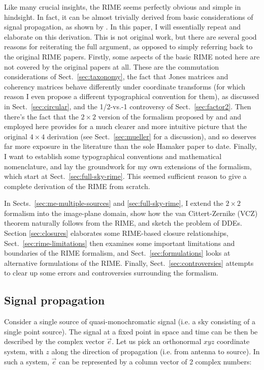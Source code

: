\documentclass{aa}
\begin{document}
Like many crucial insights, the RIME seems perfectly obvious and simple in hindsight. In fact, it can be almost trivially derived from basic considerations of signal propagation, as shown by \citet{ME1}. In this paper, I will essentially repeat and elaborate on this derivation. This is not original work, but there are several good reasons for reiterating the full argument, as opposed to simply referring back to the original RIME papers. Firstly, some aspects of the basic RIME noted here are not covered by the original papers at all. These are the commutation considerations of Sect.~\ref{sec:taxonomy}, the fact that Jones matrices and coherency matrices behave differently under coordinate transforms (for which reason I even propose a different typographical convention for them), as discussed in Sect.~\ref{sec:circular}, and the 1/2-vs.-1 controversy of Sect.~\ref{sec:factor2}. Then there's the fact that the $2\times2$ version of the formalism proposed by \citet{ME4} and and employed here provides for a much clearer and more intuitive picture that the original $4\times4$ derivation (see Sect.~\ref{sec:mueller} for a discussion), and so deserves far more exposure in the literature than the sole Hamaker paper to date. Finally, I want to establish some typographical conventions and mathematical nomenclature, and lay the groundwork for my own extensions of the formalism, which start at Sect.~\ref{sec:full-sky-rime}. This seemed sufficient reason to give a complete derivation of the RIME from scratch.

In Sects.~\ref{sec:me-multiple-sources} and \ref{sec:full-sky-rime}, I extend the $2\times2$ formalism into the image-plane domain, show how the van Cittert-Zernike (VCZ) theorem naturally follows from the RIME, and sketch the problem of DDEs. Section \ref{sec:closures} elaborates some RIME-based closure relationships, Sect.~\ref{sec:rime-limitations} then examines some important limitations and boundaries of the RIME formalism, and Sect.~\ref{sec:formulations} looks at alternative formulations of the RIME. Finally, Sect.~\ref{sec:controversies} attempts to clear up some errors and controversies surrounding the formalism.


\subsection{Signal propagation}

Consider a single source of quasi-monochromatic signal (i.e. a sky consisting of a single point source). The signal at a fixed point in space and time can be then be described by the complex vector $\vec e$. Let us pick an orthonormal $xyz$ coordinate system, with $z$ along the direction of propagation (i.e. from antenna to source). In such a system, $\vec e$ can be represented by a column vector of 2 complex numbers:
\end{document}
